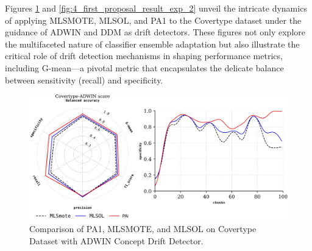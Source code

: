 Figures \ref{fig:4_first_proposal_result_exp_1} and \ref{fig:4_first_proposal_result_exp_2} unveil the intricate dynamics of applying MLSMOTE, MLSOL, and PA1 to the Covertype dataset under the guidance of ADWIN and DDM as drift detectors. These figures not only explore the multifaceted nature of classifier ensemble adaptation but also illustrate the critical role of drift detection mechanisms in shaping performance metrics, including G-mean—a pivotal metric that encapsulates the delicate balance between sensitivity (recall) and specificity.
\vspace{-3mm}
\begin{figure}[H]
	\centering
	\includegraphics[width=1\linewidth]{4_Imbalanced/figures/exp_1.png}
	\caption{Comparison of PA1, MLSMOTE, and MLSOL on Covertype Dataset with ADWIN Concept Drift Detector.}
	\label{fig:4_first_proposal_result_exp_1}
\end{figure}
